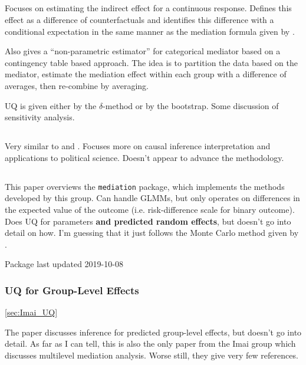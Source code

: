 \documentclass{article}
\begin{document}
\subsection{\citet{Ima10II}}

Focuses on estimating the indirect effect for a continuous response. Defines this effect as a difference of counterfactuals and identifies this difference with a conditional expectation in the same manner as the mediation formula given by \citet{Pea12}. 

Also gives a ``non-parametric estimator'' for categorical mediator based on a contingency table based approach. The idea is to partition the data based on the mediator, estimate the mediation effect within each group with a difference of averages, then re-combine by averaging.

UQ is given either by the $\delta$-method or by the bootstrap. Some discussion of sensitivity analysis.


\subsection{\citet{Ima11}}

Very similar to \citet{Ima10I} and \citet{Ima10II}. Focuses more on causal inference interpretation and applications to political science. Doesn't appear to advance the methodology.

\subsection{\citet{Tin14}}

This paper overviews the \texttt{mediation} package, which implements the methods developed by this group. Can handle GLMMs, but only operates on differences in the expected value of the outcome (i.e. risk-difference scale for binary outcome). Does UQ for parameters \textbf{and predicted random effects}, but doesn't go into detail on how. I'm guessing that it just follows the Monte Carlo method given by \citet{Ima10I}.

Package last updated 2019-10-08

\subsubsection{UQ for Group-Level Effects}
\ref{sec:Imai_UQ}

The \citet{Tin14} paper discusses inference for predicted group-level effects, but doesn't go into detail. As far as I can tell, this is also the only paper from the Imai group which discusses multilevel mediation analysis. Worse still, they give very few references.
\end{document}
